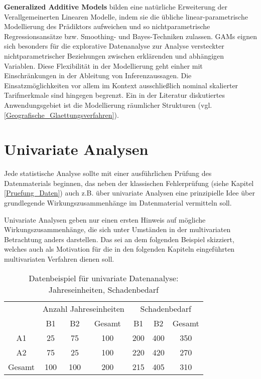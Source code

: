 \textbf{Generalized Additive Models} \cite{Hastie} bilden eine natürliche Erweiterung der Verallgemeinerten Linearen Modelle, indem sie die übliche linear-parametrische Modellierung des Prädiktors aufweichen und so nichtparametrische Regressionsansätze bzw. Smoothing- und Bayes-Techniken zulassen. GAMs eignen sich besonders für die explorative Datenanalyse zur Analyse versteckter nichtparametrischer Beziehungen zwischen erklärenden und abhängigen Variablen. Diese Flexibilität in der Modellierung geht einher mit Einschränkungen in der Ableitung von Inferenzaussagen.
Die Einsatzmöglichkeiten vor allem im Kontext ausschließlich nominal skalierter Tarifmerkmale sind hingegen begrenzt. Ein in der Literatur diskutiertes Anwendungsgebiet ist die Modellierung räumlicher Strukturen (vgl. \ref{Geografische_Glaettungsverfahren}).


\section{Univariate Analysen}  %

Jede statistische Analyse sollte mit einer ausführlichen Prüfung des Datenmaterials beginnen, das neben der klassischen Fehlerprüfung (siehe Kapitel \ref{Pruefung_Daten}) auch z.B. über univariate Analysen eine prinzipielle Idee über grundlegende Wirkungszusammenhänge im Datenmaterial vermitteln soll.

Univariate Analysen geben nur einen ersten Hinweis auf mögliche Wirkungszusammenhänge, die sich unter Umständen in der multivariaten Betrachtung anders darstellen. Das sei an dem folgenden Beispiel skizziert, welches auch als Motivation für die in den folgenden Kapiteln eingeführten multivariaten Verfahren dienen soll.



\begin{table}
 \caption{Datenbeispiel für univariate Datenanalyse: Jahreseinheiten, Schadenbedarf}

\begin{center}
\begin{tabular}{c|c|c|c|c|c|c}
     & \multicolumn{3}{|c|}{Anzahl Jahreseinheiten} & \multicolumn{3}{|c}{Schadenbedarf}     \\
     & B1  & B2  &  Gesamt  & B1 & B2  & Gesamt   \\ \hline

A1     & 25  & 75  & 100 & 200 & 400 & 350 \\
A2     & 75  & 25  & 100 & 220 & 420 & 270 \\ \hline
Gesamt & 100 & 100 & 200 & 215 & 405 & 310 \\

\end{tabular}
\end{center}

\label{tab:Schadenbedarf}
 \end{table}





